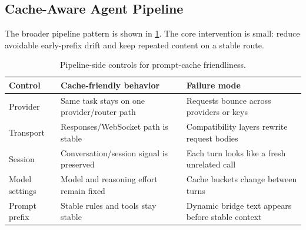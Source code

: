 \subsection{Cache-Aware Agent Pipeline}

The broader pipeline pattern is shown in \cref{tab:pipeline}. The core intervention is small: reduce avoidable early-prefix drift and keep repeated content on a stable route.

\begin{table}[h]
\centering
\caption{Pipeline-side controls for prompt-cache friendliness.}
\label{tab:pipeline}
\small
\begin{tabularx}{\linewidth}{@{}lXX@{}}
\toprule
\textbf{Control} & \textbf{Cache-friendly behavior} & \textbf{Failure mode} \\
\midrule
Provider & Same task stays on one provider/router path & Requests bounce across providers or keys \\
Transport & Responses/WebSocket path is stable & Compatibility layers rewrite request bodies \\
Session & Conversation/session signal is preserved & Each turn looks like a fresh unrelated call \\
Model settings & Model and reasoning effort remain fixed & Cache buckets change between turns \\
Prompt prefix & Stable rules and tools stay stable & Dynamic bridge text appears before stable context \\
\bottomrule
\end{tabularx}
\end{table}
